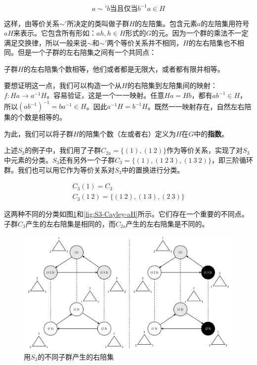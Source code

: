 \documentclass[b5paper]{ctexart}
\begin{document}
\[
a \sim' b \text{当且仅当} b^{-1}a \in H
\]

这样，由等价关系$\sim'$所决定的类叫做子群$H$的左陪集。包含元素$a$的左陪集用符号$aH$来表示。它包含所有形如：$ah, h \in H$形式的$G$的元。因为一个群的乘法不一定满足交换律，所以一般来说$\sim$和$\sim'$两个等价关系并不相同，$H$的左右陪集也不相同。但是一个子群的左右陪集之间有一个共同点：

\begin{theorem}
子群$H$的左右陪集个数相等，他们或者都是无限大，或者都有限并相等。
\end{theorem}

要想证明这一点，我们可以构造一个从$H$的右陪集到左陪集间的映射：$f: Ha \to a^{-1}H$。容易验证，这是一个一一映射。任意$Ha = Hb$，都有$ab^{-1} \in H$，所以$(ab^{-1})^{-1} = ba^{-1} \in H$。因此$a^{-1}H= b^{-1}H$。既然一一映射存在，自然左右陪集的个数是相等的。

为此，我们可以将子群$H$的陪集个数（左或者右）定义为$H$在$G$中的\textbf{指数}。

上述$S_3$的例子中，我们用了子群$C_{2a} = \{(1), (1\ 2)\}$作为等价关系，实现了对$S_3$中元素的分类。$S_3$还有另外一个子群$C_3 = \{(1), (1\ 2\ 3), (1\ 3\ 2)\}$，即三阶循环群。我们也可以用它作为等价关系对$S_3$中的置换进行分类。

\[
\begin{array}{l}
C_3 (1) = C_3 \\
C_3 (1\ 2) = \{(1\ 2), (1\ 3), (2\ 3)\}
\end{array}
\]

这两种不同的分类如图\ref{fig:S3-Cayley}和\ref{fig:S3-Cayley-aH}所示。它们存在一个重要的不同点。子群$C_3$产生的左右陪集是相同的，而$C_{2a}$产生的左右陪集是不同的。

\begin{figure}[htbp]
 \centering
 \includegraphics[scale=0.4]{img/S3-Cayley}
 \caption{用$S_3$的不同子群产生的右陪集}
 \label{fig:S3-Cayley}
\end{figure}
\end{document}
